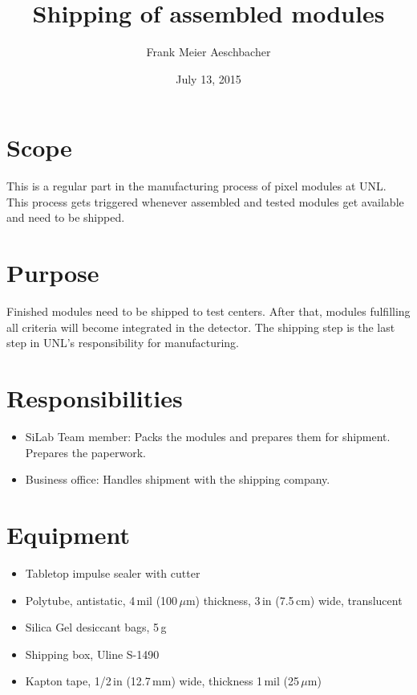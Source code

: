 \documentclass[12pt]{unlsilabsop}
\title{Shipping of assembled modules}
\date{July 13, 2015}
\author{Frank Meier Aeschbacher}
\begin{document}
\maketitle

\section{Scope}
This is a regular part in the manufacturing process of pixel modules at UNL. This process gets triggered whenever assembled and tested modules get available and need to be shipped.

\section{Purpose}
Finished modules need to be shipped to test centers. After that, modules fulfilling all criteria will become integrated in the detector. The shipping step is the last step in UNL's responsibility for manufacturing.


\section{Responsibilities}

\begin{itemize}
    \item SiLab Team member: Packs the modules and prepares them for shipment. Prepares the paperwork.
    \item Business office: Handles shipment with the shipping company.
\end{itemize}

\section{Equipment}

\begin{itemize}
    \item Tabletop impulse sealer with cutter
    \item Polytube, antistatic, 4\,mil (100\,$\mu$m) thickness, 3\,in (7.5\,cm) wide, translucent
    \item Silica Gel desiccant bags, 5\,g
    \item Shipping box, Uline S-1490
    \item Kapton tape, 1/2\,in (12.7\,mm) wide, thickness 1\,mil (25\,$\mu$m)
\end{itemize}
\end{document}
